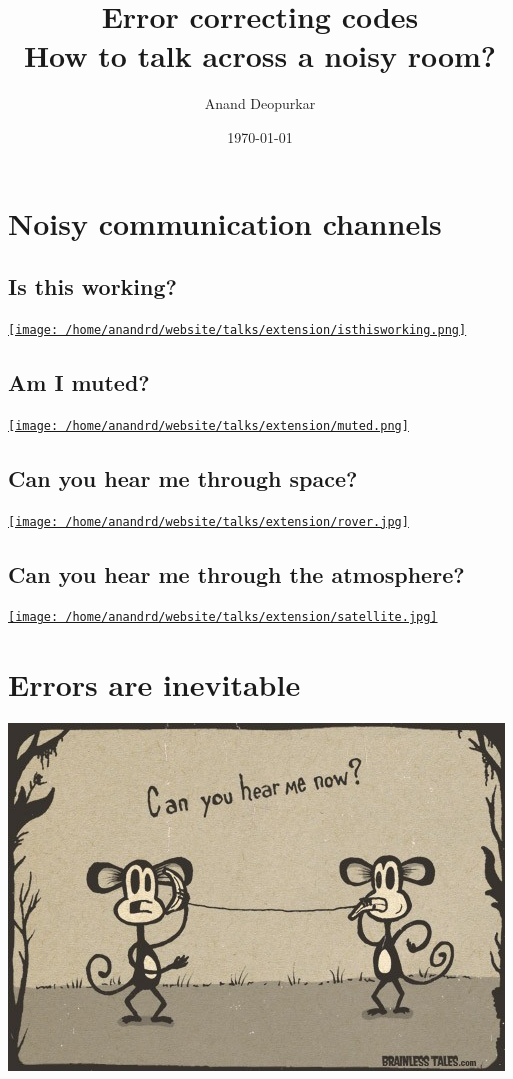 \documentclass[11pt]{article}
\author{Anand Deopurkar}
\date{\today}
\title{Error correcting codes\\\medskip
\large How to talk across a noisy room?}
\begin{document}
\maketitle

\section*{Noisy communication channels}
\label{sec:org1ce0c8a}
\subsection*{Is this working?}
\label{sec:orgdff14f5}
\href{isthisworking.png}{\texttt{[image: /home/anandrd/website/talks/extension/isthisworking.png]}}

\subsection*{Am I muted?}
\label{sec:org90cb712}
\href{muted.png}{\texttt{[image: /home/anandrd/website/talks/extension/muted.png]}}
\subsection*{Can you hear me through space?}
\label{sec:orgc01e9b4}
\href{rover.jpg}{\texttt{[image: /home/anandrd/website/talks/extension/rover.jpg]}}

\subsection*{Can you hear me through the atmosphere?}
\label{sec:org6251ae1}
\href{satellite.jpg}{\texttt{[image: /home/anandrd/website/talks/extension/satellite.jpg]}}

\section*{Errors are inevitable}
\label{sec:orgdc0c07a}
\begin{center}
\includegraphics[width=.9\linewidth]{canyouhearme.jpg}
\end{center}
\end{document}
